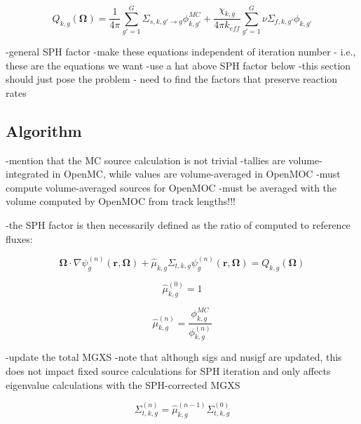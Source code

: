 \begin{dmath}
\label{eqn:chap6-sph-source}
Q_{k,g}(\mathbf{\Omega}) = \frac{1}{4\pi} \sum_{g'=1}^{G} \Sigma_{s,k,g' \rightarrow g}\phi_{k,g'}^{MC} + \frac{\chi_{k,g}}{4\pi k_{eff}}\sum_{g'=1}^{G} \nu\Sigma_{f,k,g'}\phi_{k,g'}
\end{dmath}

-general SPH factor
-make these equations independent of iteration number - i.e., these are the equations we want
-use a hat above SPH factor below 
-this section should just pose the problem - need to find the factors that preserve reaction rates

\subsection{Algorithm}
\label{subsec:chap6-sph-overview}

-mention that the MC source calculation is not trivial
-tallies are volume-integrated in OpenMC, while values are volume-averaged in OpenMOC
-must compute volume-averaged sources for OpenMOC
  -must be averaged with the volume computed by OpenMOC from track lengths!!!

-the SPH factor is then necessarily defined as the ratio of computed to reference fluxes:

\begin{dmath}
\label{eqn:chap6-sph-transport-eqn-iterate}
\mathbf{\Omega} \cdot \nabla \psi_{g}^{(n)}(\mathbf{r},\mathbf{\Omega}) + \hat{\mu}_{k,g}\Sigma_{t,k,g}\psi_{g}^{(n)}(\mathbf{r},\mathbf{\Omega}) = Q_{k,g}(\mathbf{\Omega})
\end{dmath}

\begin{dmath}
\label{eqn:chap6-sph-initial}
\hat{\mu}_{k,g}^{(0)} = 1
\end{dmath}

\begin{equation}
\label{eqn:chap6-sph-update}
\hat{\mu}_{k,g}^{(n)} = \frac{\phi_{k,g}^{MC}}{\phi_{k,g}^{(n)}}
\end{equation}

-update the total MGXS
-note that although sigs and nusigf are updated, this does not impact fixed source calculations for SPH iteration and only affects eigenvalue calculations with the SPH-corrected MGXS

\begin{dmath}
\label{eqn:chap6-sph-update-sigt}
\Sigma_{t,k,g}^{(n)} = \hat{\mu}_{k,g}^{(n-1)}\Sigma_{t,k,g}^{(0)}
\end{dmath}

